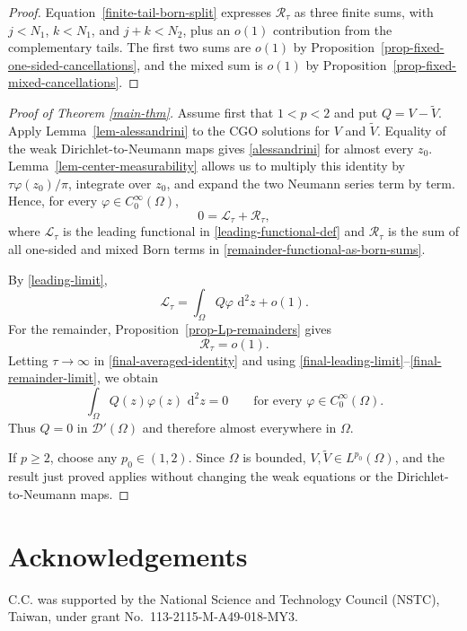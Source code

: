 \documentclass[a4paper,11pt]{article}
\newcommand{\dd}{\,\text{d}}
\theoremstyle{plain}
\theoremstyle{definition}
\theoremstyle{remark}
\begin{document}
\begin{proof}
Equation~\eqref{finite-tail-born-split} expresses $\mathcal R_\tau$ as three finite sums, with $j<N_1$, $k<N_1$, and $j+k<N_2$, plus an $o(1)$ contribution from the complementary tails.  The first two sums are $o(1)$ by Proposition~\ref{prop-fixed-one-sided-cancellations}, and the mixed sum is $o(1)$ by Proposition~\ref{prop-fixed-mixed-cancellations}.
\end{proof}

\begin{proof}[Proof of Theorem \ref{main-thm}]
Assume first that $1<p<2$ and put $Q=V-\widetilde V$.  Apply Lemma~\ref{lem-alessandrini} to the CGO solutions for $V$ and $\widetilde V$.  Equality of the weak Dirichlet-to-Neumann maps gives \eqref{alessandrini} for almost every $z_0$.  Lemma~\ref{lem-center-measurability} allows us to multiply this identity by $\tau\varphi(z_0)/\pi$, integrate over $z_0$, and expand the two Neumann series term by term.  Hence, for every $\varphi\in C_0^\infty(\Omega)$,
\begin{equation}\label{final-averaged-identity}
 0=\mathcal L_\tau+\mathcal R_\tau,
\end{equation}
where $\mathcal L_\tau$ is the leading functional in
\eqref{leading-functional-def} and $\mathcal R_\tau$ is the sum of all
one-sided and mixed Born terms in
\eqref{remainder-functional-as-born-sums}.

By \eqref{leading-limit},
\begin{equation}\label{final-leading-limit}
 \mathcal L_\tau=\int_\Omega Q\varphi\,\dd^2z+o(1).
\end{equation}
For the remainder, Proposition~\ref{prop-Lp-remainders} gives
\begin{equation}\label{final-remainder-limit}
 \mathcal R_\tau=o(1).
\end{equation}
Letting $\tau\to\infty$ in \eqref{final-averaged-identity} and using
\eqref{final-leading-limit}--\eqref{final-remainder-limit}, we obtain
\begin{equation*}
 \int_\Omega Q(z)\varphi(z)\,\dd^2z=0
 \qquad\text{for every }\varphi\in C_0^\infty(\Omega).
\end{equation*}
Thus $Q=0$ in $\mathcal D'(\Omega)$ and therefore almost everywhere in $\Omega$.

If $p\geq2$, choose any $p_0\in(1,2)$.  Since $\Omega$ is bounded, $V,\widetilde V\in L^{p_0}(\Omega)$, and the result just proved applies without changing the weak equations or the Dirichlet-to-Neumann maps.
\end{proof}

\section*{Acknowledgements}
C.C. was supported by the National Science and Technology Council (NSTC), Taiwan, under grant No.~113-2115-M-A49-018-MY3.



\end{document}

